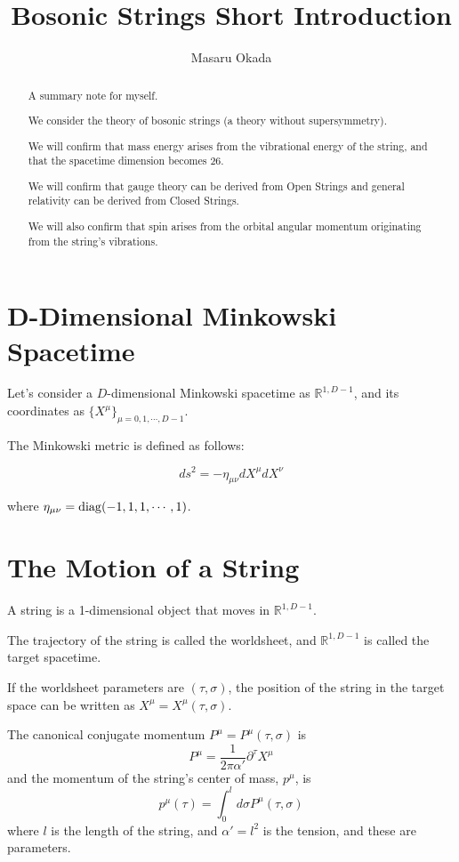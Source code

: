 \documentclass[uplatex]{jsarticle}
\title{
Bosonic Strings Short Introduction
}
\author{
Masaru Okada
}
\begin{document}
\maketitle

\begin{abstract}
	A summary note for myself.

	We consider the theory of bosonic strings (a theory without supersymmetry).

	We will confirm that mass energy arises from the vibrational energy of the string, and that the spacetime dimension becomes 26.

	We will confirm that gauge theory can be derived from Open Strings and general relativity can be derived from Closed Strings.

	We will also confirm that spin arises from the orbital angular momentum originating from the string's vibrations.

\end{abstract}

\section{D-Dimensional Minkowski Spacetime}

Let's consider a $D$-dimensional Minkowski spacetime as
$\mathbb{R}^{1,D-1}$,
and its coordinates as
$\{ X^{\mu} \}_{\mu=0,1,\cdots,D-1}$.

The Minkowski metric is defined as follows:

$$
	ds^{2} = - \eta_{\mu \nu} dX^{\mu} dX^{\nu}
$$


where
$\eta_{\mu \nu} = {\rm diag} (-1, 1,1,\cdots,1)$.

\section{The Motion of a String}

A string is a 1-dimensional object that moves in
$\mathbb{R}^{1,D-1}$.

The trajectory of the string is called the worldsheet, and
$\mathbb{R}^{1,D-1}$
is called the target spacetime.

If the worldsheet parameters are
$(\tau,\sigma)$,
the position of the string in the target space can be written as
$X^{\mu}=X^{\mu}(\tau, \sigma)$.

The canonical conjugate momentum
$P^{\mu}=P^{\mu}(\tau, \sigma)$
is
$$
	P^{\mu}
	=
	\frac{1}{2 \pi \alpha'}
	\partial^{\tau} X^{\mu}
$$
and the momentum of the string's center of mass,
$p^{\mu}$,
is
$$
	p^{\mu}(\tau)
	=
	\int^{l}_{0}
	d \sigma
	P^{\mu}(\tau, \sigma)
$$
where
$l$
is the length of the string, and
$\alpha'=l^{2}$
is the tension, and these are parameters.
\end{document}
